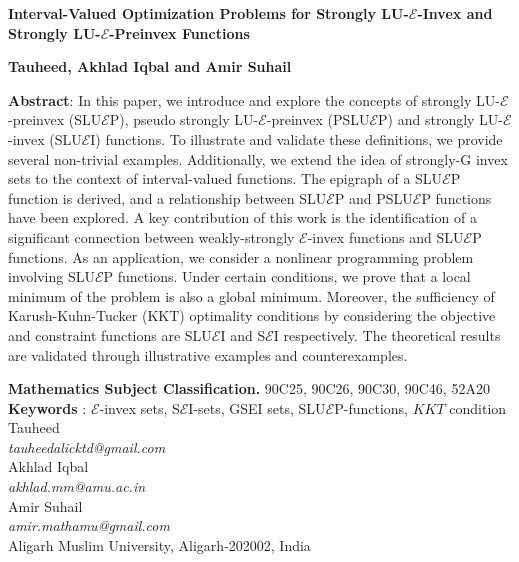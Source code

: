 \documentclass[12pt, reqno]{amsart}
\theoremstyle{definition}
\theoremstyle{remark}
\numberwithin{equation}{section}
\begin{document}
\setcounter{page}{1}
\setcounter{page}{1}

\noindent 
{\textbf{\Large Interval-Valued Optimization Problems for Strongly LU-$\mathcal{E}$-Invex and Strongly LU-$\mathcal{E}$-Preinvex Functions}}\\

	\begin{center}
		{\bf Tauheed, Akhlad Iqbal and Amir Suhail  }
	\end{center}
\bigskip
 

 
  
\textbf{Abstract}: In this paper, we introduce and explore the concepts of  strongly LU-$\mathcal{E}$-preinvex (SLU$\mathcal{E}$P), pseudo strongly  LU-$\mathcal{E}$-preinvex (PSLU$\mathcal{E}$P) and strongly LU-$\mathcal{E}$-invex (SLU$\mathcal{E}$I) functions. To illustrate and validate these definitions, we provide several non-trivial examples. Additionally, we extend the idea of strongly-G invex sets to the context of interval-valued functions. The epigraph of a SLU$\mathcal{E}$P function is derived, and a relationship between SLU$\mathcal{E}$P and PSLU$\mathcal{E}$P functions have been explored. A key contribution of this work is the identification of a significant connection between weakly-strongly $\mathcal{E}$-invex functions and SLU$\mathcal{E}$P functions. As an application, we consider a nonlinear programming problem involving SLU$\mathcal{E}$P functions. Under certain conditions, we prove that a local minimum of the problem is also a global minimum. Moreover, the sufficiency of Karush-Kuhn-Tucker (KKT) optimality conditions by considering the objective and constraint functions are SLU$\mathcal{E}$I and S$\mathcal{E}$I respectively. The theoretical results are validated through illustrative examples and counterexamples.


\noindent
{\bf{Mathematics Subject Classification.}} 90C25, 90C26, 90C30, 90C46, 52A20\\
 \noindent
 {\bf{Keywords}} {: $\mathcal{E}$-invex sets, S$\mathcal{E}$I-sets, GSEI sets, SLU$\mathcal{E}$P-functions, $KKT$ condition}\\

\noindent
Tauheed\\  
{\textit{tauheedalicktd@gmail.com}}\\
\noindent
Akhlad Iqbal\\  
{\textit{akhlad.mm@amu.ac.in}}\\
\noindent
Amir Suhail\\  
{\textit{amir.mathamu@gmail.com}}\\
\noindent
Aligarh Muslim University, Aligarh-202002, India\\
\end{document}

